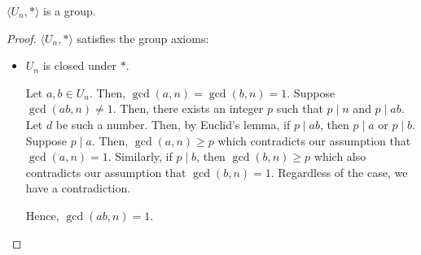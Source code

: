     \begin{thm}
        \(\langle U_n, *\rangle\) is a group.
    \end{thm}

    \begin{proof}
        \(\langle U_n, *\rangle\) satisfies the group axioms:
        \begin{itemize}
            \item \(U_n\) is closed under \(*\).

            Let \(a, b\in U_n\). Then, \(\gcd(a, n) = \gcd(b, n) = 1\). Suppose \(\gcd(ab, n) \neq 1\). Then, there exists an integer \(p\) such that \(p \mid n\) and \(p \mid ab\). Let \(d\) be such a number. Then, by Euclid's lemma, if \(p \mid ab\), then \(p \mid a\) or \(p \mid b\). Suppose \(p \mid a\). Then, \(\gcd(a, n) \geq p\) which contradicts our assumption that \(\gcd(a, n) = 1\). Similarly, if \(p \mid b\), then \(\gcd(b, n) \geq p\) which also contradicts our assumption that \(\gcd(b, n) = 1\). Regardless of the case, we have a contradiction.
            
            Hence, \(\gcd(ab, n) = 1\).
        \end{itemize}
    \end{proof}

    \mbox{}

